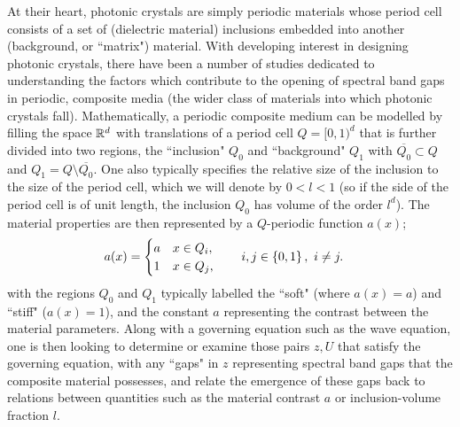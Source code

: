 At their heart, photonic crystals are simply periodic materials whose period cell consists of a set of (dielectric material) inclusions embedded into another (background, or ``matrix") material.
With developing interest in designing photonic crystals, there have been a number of studies dedicated to understanding the factors which contribute to the opening of spectral band gaps in periodic, composite media (the wider class of materials into which photonic crystals fall).
Mathematically, a periodic composite medium can be modelled by filling the space $\mathbb{R}^d$ with translations of a period cell $Q=[0,1)^d$ that is further divided into two regions, the ``inclusion" $Q_0$ and ``background" $Q_1$ with $\overline{Q_0}\subset Q$ and $Q_1=Q\setminus\overline{Q_0}$.
One also typically specifies the relative size of the inclusion to the size of the period cell, which we will denote by $0<l<1$ (so if the side of the period cell is of unit length, the inclusion $Q_0$ has volume of the order $l^d$).
The material properties are then represented by a $Q$-periodic function $a(x)$;
\begin{align*}
	a(x) &= \begin{cases} a & x\in Q_i, \\ 1 & x\in Q_j, \end{cases}
	\qquad i,j\in\left\{ 0,1 \right\}, \ i\neq j.
\end{align*}
with the regions $Q_0$ and $Q_1$ typically labelled the ``soft" (where $a(x)=a$) and ``stiff" ($a(x)=1$), and the constant $a$ representing the contrast between the material parameters.
Along with a governing equation such as the wave equation, one is then looking to determine or examine those pairs $z, U$ that satisfy the governing equation, with any ``gaps" in $z$ representing spectral band gaps that the composite material possesses, and relate the emergence of these gaps back to relations between quantities such as the material contrast $a$ or inclusion-volume fraction $l$.

